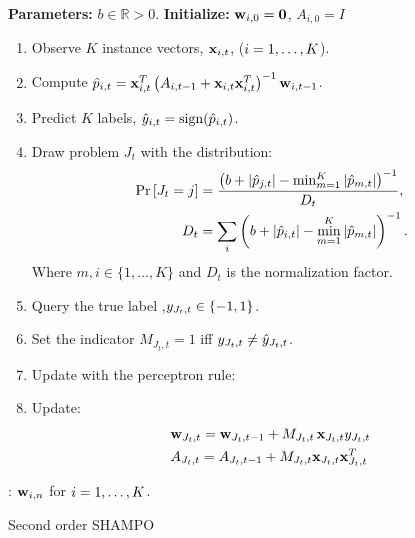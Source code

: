 \begin{algorithm}
\begin{algorithmic}
   \State \textbf{Parameters:}  $b\in\mathbb{R}>0$.
   \State \textbf{Initialize:} $\mathbf{w}_{i,0}={\boldsymbol{0}}$, $A_{i,0}=I$ \\
     \begin{enumerate}
     \nolineskips
     \item Observe $K$ instance vectors, $\mathbf{x}_{i,t}$, ($i=1 , \ldots , K$).
     \item Compute  $\hat{p}_{i,t}=\mathbf{x}_{i,t}^T \left({A_{i,t-1}+\mathbf{x}_{i,t}\mathbf{x}_{i,t}^T}\right)^{-1}\mathbf{w}_{i,t-1}$.
     \item Predict $K$ labels, $\hat{y}_{i,t}={\rm sign}(\hat{p}_{i,t})$.
     \item Draw problem $J_t$  with the distribution:
      \begin{align}
    {\rm Pr}\left[{J_t=j}\right] &=
    \frac{\left({b+\left\vert{\hat{p}_{j,t}}\right\vert-\min_{m=1}^K\left\vert{\hat{p}_{m,t}}\right\vert}\right)^{-1}}{D_{t}},\nonumber\\
    D_t &=\sum_i \left({b+\left\vert{\hat{p}_{i,t}}\right\vert-\min_{m=1}^K\left\vert{\hat{p}_{m,t}}\right\vert}\right)^{-1}. \nonumber
     \end{align}
     Where $m,i\in\{1,...,K\}$ and $D_t$ is the normalization factor. 
  \item Query the true label ,$y_{J_t,t}\in\{-1,1\}$.
  \item Set the indicator $M_{J_t, t}=1$ iff $y_{J_t,t} \neq \hat{y}_{J_t,t}$.
  \item Update with the perceptron rule:     
     \item Update:
     \begin{align}
     &\mathbf{w}_{J_t,t} = \mathbf{w}_{J_t,t-1}+M_{J_t,t}\,  \mathbf{x}_{J_t,t}  y_{J_t,t}\,\label{SO_update}\\
     &A_{J_t,t}=A_{J_t,t-1}+ M_{J_t,t}\mathbf{x}_{J_t,t}\mathbf{x}_{J_t,t}^T\nonumber
     \end{align}
     \end{enumerate}
   \EndFor  
   : $\mathbf{w}_{i,n}$ for $i=1 , \ldots , K$.
\end{algorithmic}
\caption{Second order SHAMPO }\label{alg:SO_SHAMPO}
\end{algorithm}

